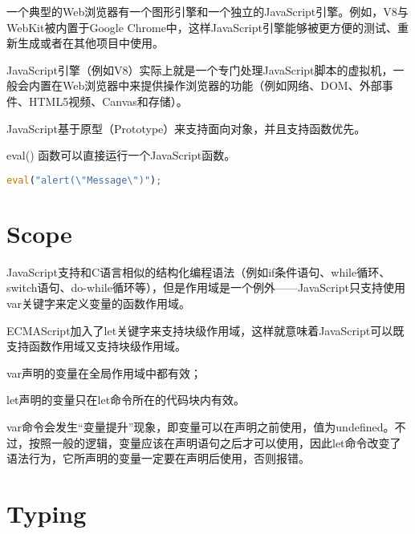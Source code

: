 一个典型的Web浏览器有一个图形引擎和一个独立的JavaScript引擎。例如，V8与WebKit被内置于Google Chrome中，这样JavaScript引擎能够被更方便的测试、重新生成或者在其他项目中使用。

JavaScript引擎（例如V8）实际上就是一个专门处理JavaScript脚本的虚拟机，一般会内置在Web浏览器中来提供操作浏览器的功能（例如网络、DOM、外部事件、HTML5视频、Canvas和存储）。





JavaScript基于原型（Prototype）来支持面向对象，并且支持函数优先。

\begin{compactitem}
\item eval() 函数可以直接运行一个JavaScript函数。

\begin{lstlisting}[language=JavaScript]
eval("alert(\"Message\")");
\end{lstlisting}

\end{compactitem}


\section{Scope}






JavaScript支持和C语言相似的结构化编程语法（例如if条件语句、while循环、switch语句、do-while循环等），但是作用域是一个例外——JavaScript只支持使用var关键字来定义变量的函数作用域。




ECMAScript加入了let关键字来支持块级作用域，这样就意味着JavaScript可以既支持函数作用域又支持块级作用域。

\begin{compactitem}
\item var声明的变量在全局作用域中都有效；
\item let声明的变量只在let命令所在的代码块内有效。
\end{compactitem}

var命令会发生“变量提升”现象，即变量可以在声明之前使用，值为undefined。不过，按照一般的逻辑，变量应该在声明语句之后才可以使用，因此let命令改变了语法行为，它所声明的变量一定要在声明后使用，否则报错。



\section{Typing}


